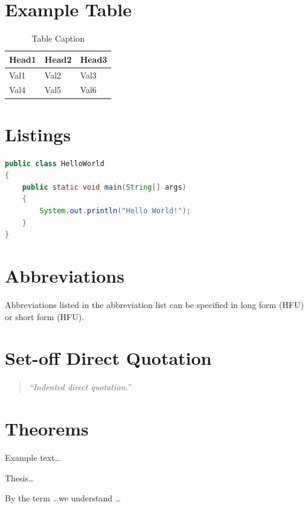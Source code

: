 \section{Example Table}

\begin{table}
\caption{Table Caption}
\center
\footnotesize
\begin{tabular}{lll}
\toprule
Head1 & Head2 & Head3 \\
\midrule
Val1 & Val2 & Val3 \\
Val4 & Val5 & Val6 \\
\bottomrule
\end{tabular}
\end{table}

\section{Listings}

\begin{lstlisting}[language=java, caption=Hello World in Java]
public class HelloWorld 
{
	public static void main(String[] args) 
	{
		System.out.println("Hello World!");
	}
}
\end{lstlisting}


\section{Abbreviations}

Abbreviations listed in the abbreviation list can be specified in long form (\ac{HFU}) or short form (\acs{HFU}).

\section{Set-off Direct Quotation}

\lipsum[10]

\begin{quote}
\textit{\enquote{Indented direct quotation.}}\cite[S. 14ff]{s11wasml}
\end{quote}

\lipsum[10]

\section{Theorems}

\lipsum[2]

\begin{example}
Example text\dots
\end{example}
 
\lipsum[2]

\begin{thesis}
Thesis\dots
\end{thesis}
 
\lipsum[2]
 
\begin{definition}
	By the term \dots we understand \dots
\end{definition}

\lipsum[2]